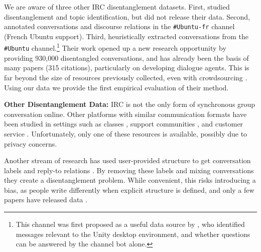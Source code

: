 \documentclass[11pt,a4paper]{article}
\makeatletter
\newcommand{\LoweCites}{315\@\xspace}
\newcommand{\tightparagraph}[1]{\noindent\textbf{#1:}}
\makeatother
\begin{document}
We are aware of three other IRC disentanglement datasets.
First, \citet{Adams:2008} studied disentanglement and topic identification, but did not release their data.
Second, \citet{Riou:2015} annotated conversations and discourse relations in the \texttt{\#Ubuntu-fr} channel (French Ubuntu support).
Third, \citet{Lowe:2015,Lowe:2017:DD} heuristically extracted conversations from the \texttt{\#Ubuntu} channel.\footnote{
  This channel was first proposed as a useful data source by \citet{uthus-aha:2013:IJCNLP,Uthus:2013:FLAIRS,Uthus:2013:AAAI}, who identified messages relevant to the Unity desktop environment, and whether questions can be answered by the channel bot alone.
}
Their work opened up a new research opportunity by providing 930,000 disentangled conversations, and has already been the basis of many papers (\LoweCites citations), particularly on developing dialogue agents.
This is far beyond the size of resources previously collected, even with crowdsourcing \citep{hcw:2013}.
Using our data we provide the first empirical evaluation of their method.

\tightparagraph{Other Disentanglement Data}
IRC is not the only form of synchronous group conversation online.
Other platforms with similar communication formats have been studied in settings such as
classes \citep{wang-rose:icwsm:2008,Dulceanu:2016},
support communities \citep{mayfield:2012:SIGDIAL},
and customer service \citep{Du:2017:AAAI}.
Unfortunately, only one of these resources \citep{Dulceanu:2016} is available, possibly due to privacy concerns.

Another stream of research has used user-provided structure to get
conversation labels \cite{Shen:2006,Domeniconi:2016}
and reply-to relations \cite{wang-rose:2010:NAACLHLT,Wang:2011:SIGIR,ICWSM112840,Balali:2013,Balali:2014,Chen:2017}.
By removing these labels and mixing conversations they create a disentanglement problem.
While convenient, this risks introducing a bias, as people write differently when explicit structure is defined, and only a few papers have released data \cite{ABBOTT16.1126,Zhang:2017,louis-cohen:2015:EMNLP}.
\end{document}
